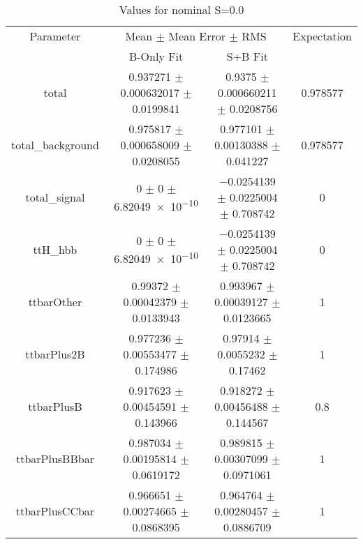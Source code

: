 \begin{table}
\centering
\caption{Values for nominal S=0.0}
\begin{tabular}{cccc}
\toprule
Parameter & \multicolumn{2}{c}{Mean $\pm$ Mean Error $\pm$ RMS} & Expectation\\
 & B-Only Fit & S+B Fit & \\
\midrule
total & \num{0.937271} $\pm$ \num{0.000632017} $\pm$ \num{0.0199841} & \num{0.9375} $\pm$ \num{0.000660211} $\pm$ \num{0.0208756} & \num{0.978577}\\
total\_background & \num{0.975817} $\pm$ \num{0.000658009} $\pm$ \num{0.0208055} & \num{0.977101} $\pm$ \num{0.00130388} $\pm$ \num{0.041227} & \num{0.978577}\\
total\_signal & \num{0} $\pm$ \num{0} $\pm$ \num{6.82049e-10} & \num{-0.0254139} $\pm$ \num{0.0225004} $\pm$ \num{0.708742} & \num{0}\\
ttH\_hbb & \num{0} $\pm$ \num{0} $\pm$ \num{6.82049e-10} & \num{-0.0254139} $\pm$ \num{0.0225004} $\pm$ \num{0.708742} & \num{0}\\
ttbarOther & \num{0.99372} $\pm$ \num{0.00042379} $\pm$ \num{0.0133943} & \num{0.993967} $\pm$ \num{0.00039127} $\pm$ \num{0.0123665} & \num{1}\\
ttbarPlus2B & \num{0.977236} $\pm$ \num{0.00553477} $\pm$ \num{0.174986} & \num{0.97914} $\pm$ \num{0.0055232} $\pm$ \num{0.17462} & \num{1}\\
ttbarPlusB & \num{0.917623} $\pm$ \num{0.00454591} $\pm$ \num{0.143966} & \num{0.918272} $\pm$ \num{0.00456488} $\pm$ \num{0.144567} & \num{0.8}\\
ttbarPlusBBbar & \num{0.987034} $\pm$ \num{0.00195814} $\pm$ \num{0.0619172} & \num{0.989815} $\pm$ \num{0.00307099} $\pm$ \num{0.0971061} & \num{1}\\
ttbarPlusCCbar & \num{0.966651} $\pm$ \num{0.00274665} $\pm$ \num{0.0868395} & \num{0.964764} $\pm$ \num{0.00280457} $\pm$ \num{0.0886709} & \num{1}\\
\bottomrule
\end{tabular}
\end{table}
